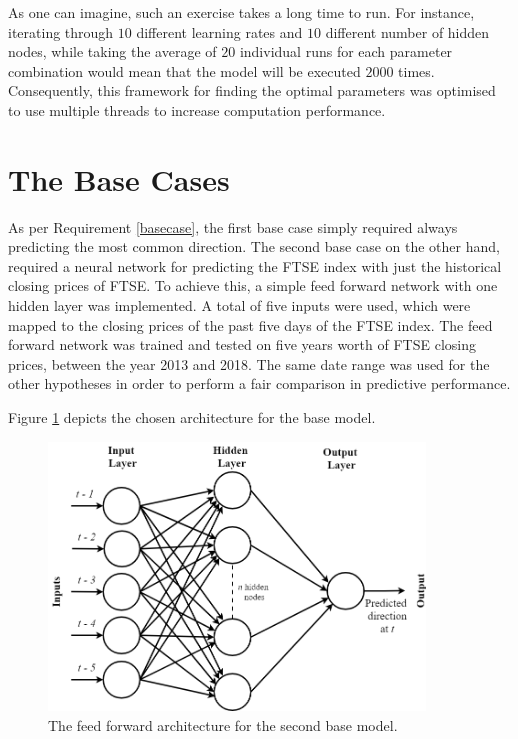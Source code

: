 \documentclass{UoYCSproject}
\begin{document}
As one can imagine, such an exercise takes a long time to run. For instance, iterating through $10$ different learning rates and $10$ different number of hidden nodes, while taking the average of $20$ individual runs for each parameter combination would mean that the model will be executed $2000$ times. Consequently, this framework for finding the optimal parameters was optimised to use multiple threads to increase computation performance.   

\section{The Base Cases}
\label{sec:thebasecase}
As per Requirement \ref{basecase}, the first base case simply required always predicting the most common direction. The second base case on the other hand, required a neural network for predicting the FTSE index with just the historical closing prices of FTSE.  To achieve this, a simple feed forward network with one hidden layer was implemented. A total of five inputs were used, which were mapped to the closing prices of the past five days of the FTSE index. The feed forward network was trained and tested on five years worth of FTSE closing prices, between the year 2013 and 2018. The same date range was used for the other hypotheses in order to perform a fair comparison in predictive performance.

Figure \ref{fig:basecase} depicts the chosen architecture for the base model. 

\begin{figure}[h]
\includegraphics[width=10cm]{Base_case_diagram.png}
\centering
\caption{The feed forward architecture for the second base model.} 
\label{fig:basecase}
\end{figure}
\end{document}
